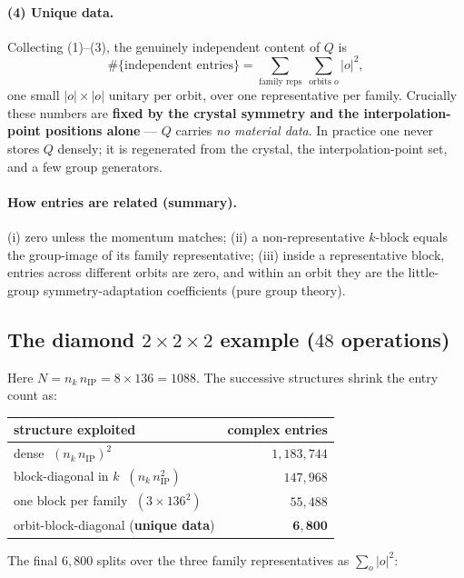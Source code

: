 \documentclass[11pt]{article}
\begin{document}
\paragraph{(4) Unique data.} Collecting (1)--(3), the genuinely independent content of $Q$ is
\[
   \#\{\text{independent entries}\}=\sum_{\text{family reps}}\ \sum_{\text{orbits }o}|o|^2 ,
\]
one small $|o|\times|o|$ unitary per orbit, over one representative per family. Crucially these numbers
are \textbf{fixed by the crystal symmetry and the interpolation-point positions alone} --- $Q$ carries
\emph{no material data}. In practice one never stores $Q$ densely; it is regenerated from the crystal,
the interpolation-point set, and a few group generators.

\paragraph{How entries are related (summary).}
(i) zero unless the momentum matches;
(ii) a non-representative $k$-block equals the group-image of its family representative;
(iii) inside a representative block, entries across different orbits are zero, and within an orbit they
are the little-group symmetry-adaptation coefficients (pure group theory).

\subsection*{The diamond $2\times2\times2$ example ($48$ operations)}

Here $N=n_k\, n_{\mathrm{IP}}=8\times136=1088$. The successive structures shrink the entry count as:

\begin{center}
\begin{tabular}{lr}
\hline
structure exploited & complex entries\\
\hline
dense $\;(n_k\, n_{\mathrm{IP}})^2$ & $1{,}183{,}744$\\
block-diagonal in $k\;\;(n_k\, n_{\mathrm{IP}}^2)$ & $147{,}968$\\
one block per family $\;(3\times136^2)$ & $55{,}488$\\
orbit-block-diagonal (\textbf{unique data}) & $\mathbf{6{,}800}$\\
\hline
\end{tabular}
\end{center}

The final $6{,}800$ splits over the three family representatives as $\sum_o |o|^2$:
\end{document}
